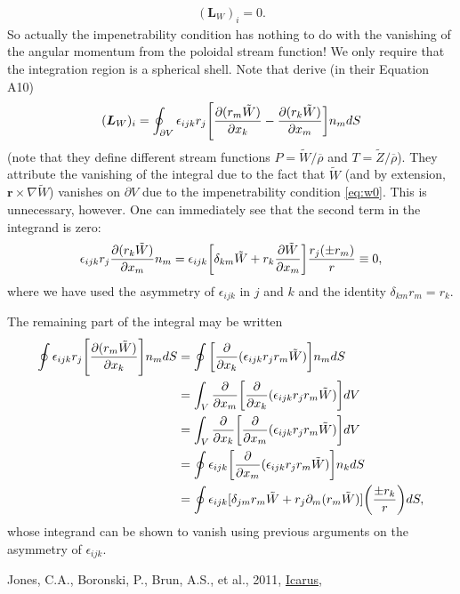 \documentclass[12pt]{article} %
\newcommand{\MYhref}[3][blue]{\href{#2}{\color{#1}{#3}}}
\newcommand{\pderiv}[2]{\frac{\partial#1}{\partial#2}}
\newcommand{\tz}{\tilde{Z}}
\newcommand{\tw}{\tilde{W}}
\newcommand{\rhobar}{\overline{\rho}}
\begin{document}
\begin{align}
(\bm{L}_W)_i = 0.
\label{eq:lw0}
\end{align}
So actually the impenetrability condition has nothing to do with the vanishing of the angular momentum from the poloidal stream function! We only require that the integration region is a spherical shell. Note that \citet{Jones11} derive (in their Equation A10)
\begin{align}
(\bm{L}_W)_i = \oint_{\partial V}\epsilon_{ijk}r_j\Bigg{[}\pderiv{(r_m\tw)}{x_k}-\pderiv{(r_k\tw)}{x_m}\bigg{]}n_mdS
\label{eq:jonesa10}
\end{align}
(note that they define different stream functions $P=\tw/\rhobar$ and $T=\tz/\rhobar$). They attribute the vanishing of the integral due to the fact that $\tw$ (and by extension, $\bm{r}\times\nabla\tw$) vanishes on $\partial V$ due to the impenetrability condition \eqref{eq:w0}. This is unnecessary, however. One can immediately see that the second term in the integrand is zero:
\begin{align*}
\epsilon_{ijk}r_j\pderiv{(r_k\tw)}{x_m}n_m = \epsilon_{ijk}\bigg{[}\delta_{km}\tw+r_k\pderiv{\tw}{x_m}\bigg{]}\frac{r_j(\pm r_m)}{r}\equiv 0,
\end{align*}
where we have used the asymmetry of $\epsilon_{ijk}$ in $j$ and $k$ and the identity $\delta_{km}r_m = r_k$.

The remaining part of the integral may be written
\begin{align*}
\oint\epsilon_{ijk}r_j\Bigg{[}\pderiv{(r_m\tw)}{x_k}\Bigg{]}n_mdS &= \oint\bigg{[}\pderiv{}{x_k}(\epsilon_{ijk}r_jr_m\tw)\bigg{]}n_mdS\\
&=\int_V\pderiv{}{x_m}\bigg{[}\pderiv{}{x_k}(\epsilon_{ijk}r_jr_m\tw)\bigg{]}dV\\
&= \int_V\pderiv{}{x_k}\bigg{[}\pderiv{}{x_m}(\epsilon_{ijk}r_jr_m\tw)\bigg{]}dV\\
&= \oint\epsilon_{ijk}\bigg{[}\pderiv{}{x_m}(\epsilon_{ijk}r_jr_m\tw)\bigg{]}n_kdS\\
&= \oint\epsilon_{ijk}[\delta_{jm}r_m\tw + r_j\partial_m(r_m\tw)]\bigg{(}\frac{\pm r_k}{r}\bigg{)}dS,
\end{align*} 
whose integrand can be shown to vanish using previous arguments on the asymmetry of $\epsilon_{ijk}$. 
\begin{thebibliography}{}
	 Jones, C.A., Boronski, P., Brun, A.S., et al., 2011, 
	\href{https://doi.org/10.1016/j.icarus.2011.08.014}{Icarus},
	\MYhref{https://ui.adsabs.harvard.edu/abs/2011Icar..216..120J/abstract}{216, 120}
\end{thebibliography}
\end{document}
